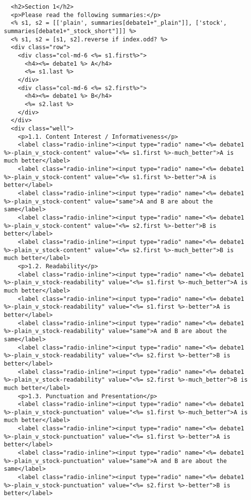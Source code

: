 \documentclass{article}
\begin{document}
\begin{verbatim}
  <h2>Section 1</h2>
  <p>Please read the following summaries:</p>
  <% s1, s2 = [['plain', summaries[debate1+"_plain"]], ['stock', summaries[debate1+"_stock_short"]]] %>
  <% s1, s2 = [s1, s2].reverse if index.odd? %>
  <div class="row">
    <div class="col-md-6 <%= s1.first%>">
      <h4><%= debate1 %> A</h4>
      <%= s1.last %>
    </div>
    <div class="col-md-6 <%= s2.first%>">
      <h4><%= debate1 %> B</h4>
      <%= s2.last %>
    </div>
  </div>
  <div class="well">
    <p>1.1. Content Interest / Informativeness</p>
    <label class="radio-inline"><input type="radio" name="<%= debate1 %>-plain_v_stock-content" value="<%= s1.first %>-much_better">A is much better</label>
    <label class="radio-inline"><input type="radio" name="<%= debate1 %>-plain_v_stock-content" value="<%= s1.first %>-better">A is better</label>
    <label class="radio-inline"><input type="radio" name="<%= debate1 %>-plain_v_stock-content" value="same">A and B are about the same</label>
    <label class="radio-inline"><input type="radio" name="<%= debate1 %>-plain_v_stock-content" value="<%= s2.first %>-better">B is better</label>
    <label class="radio-inline"><input type="radio" name="<%= debate1 %>-plain_v_stock-content" value="<%= s2.first %>-much_better">B is much better</label>
    <p>1.2. Readability</p>
    <label class="radio-inline"><input type="radio" name="<%= debate1 %>-plain_v_stock-readability" value="<%= s1.first %>-much_better">A is much better</label>
    <label class="radio-inline"><input type="radio" name="<%= debate1 %>-plain_v_stock-readability" value="<%= s1.first %>-better">A is better</label>
    <label class="radio-inline"><input type="radio" name="<%= debate1 %>-plain_v_stock-readability" value="same">A and B are about the same</label>
    <label class="radio-inline"><input type="radio" name="<%= debate1 %>-plain_v_stock-readability" value="<%= s2.first %>-better">B is better</label>
    <label class="radio-inline"><input type="radio" name="<%= debate1 %>-plain_v_stock-readability" value="<%= s2.first %>-much_better">B is much better</label>
    <p>1.3. Punctuation and Presentation</p>
    <label class="radio-inline"><input type="radio" name="<%= debate1 %>-plain_v_stock-punctuation" value="<%= s1.first %>-much_better">A is much better</label>
    <label class="radio-inline"><input type="radio" name="<%= debate1 %>-plain_v_stock-punctuation" value="<%= s1.first %>-better">A is better</label>
    <label class="radio-inline"><input type="radio" name="<%= debate1 %>-plain_v_stock-punctuation" value="same">A and B are about the same</label>
    <label class="radio-inline"><input type="radio" name="<%= debate1 %>-plain_v_stock-punctuation" value="<%= s2.first %>-better">B is better</label>

\end{verbatim}
\end{document}

